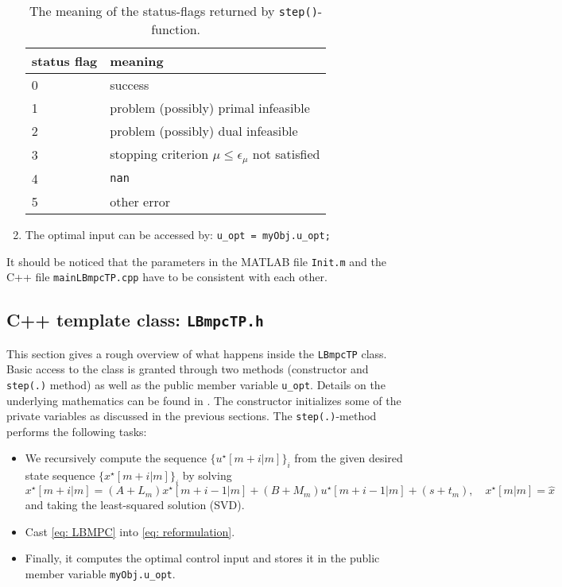 \documentclass[letter]{article}
\begin{document}
\begin{sffamily}
\begin{enumerate}
	\begin{table}[!htdp]
	\caption{The meaning of the status-flags returned by \texttt{step()}-function.}
	\begin{center}
	\begin{tabular}{|l|l|}\hline
	{
	 \bf status flag} & meaning  \\ \hline\hline
	 0 & success \\
	 1 & problem (possibly) primal infeasible\\
	 2 & problem (possibly) dual infeasible \\
	 3 & stopping criterion $\mu \leq \epsilon_\mu$ not satisfied \\
	 4 & \texttt{nan} \\
	 5 & other error \\ \hline
	\end{tabular}
	\end{center}
	\label{tab: error code}
	\end{table}
	
	\item The optimal input can be accessed by: \texttt{u\_opt = myObj.u\_opt;}
\end{enumerate}


\noindent
It should be noticed that the parameters in the MATLAB file \texttt{Init.m} and the C++ file \texttt{mainLBmpcTP.cpp} have to be consistent with each other.



\subsection{C++ template class: \texttt{LBmpcTP.h}}
This section gives a rough overview of what happens inside the \texttt{LBmpcTP} class. Basic access to the class is granted through two methods (constructor and \texttt{step(.)} method) as well as the public member variable \texttt{u\_opt}. Details on the underlying mathematics can be found in \citep{Mehrotra1992PDIPM, Potra2000IPM, Rao98IMP2MPC, Nocedal2000NumOpt}. The constructor initializes some of the private variables as discussed in the previous sections. The \texttt{step(.)}-method performs the following tasks:
\begin{itemize}
	\item We recursively compute the sequence $\{  u^\star[m+i|m]  \}_i$ from the given desired state sequence $\{ x^\star[m+i|m] \}_i$ by solving 
	\begin{equation*}
			x^\star [m+i|m] = (A+L_m)x^\star[m+i-1|m] + (B+M_m)u^\star[m+i-1|m] + (s+t_m),\quad x^\star[m|m]=\hat{x}
	\end{equation*}
	and taking the least-squared solution (SVD).
	\item Cast \eqref{eq: LBMPC} into \eqref{eq: reformulation}.
	\item Finally, it computes the optimal control input and stores it in the public member variable \texttt{myObj.u\_opt}.
\end{itemize}



\end{sffamily}
\end{document}
